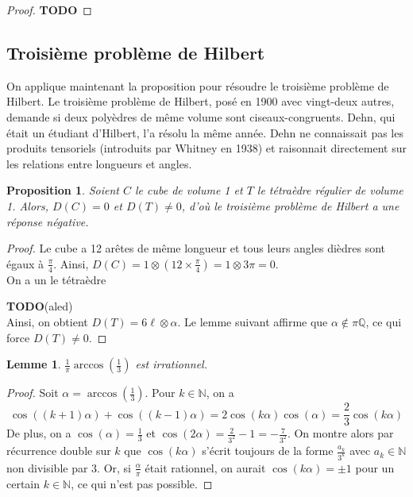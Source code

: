\documentclass{article}
\newcommand{\N}{\mathbb{N}}
\newcommand{\Q}{\mathbb{Q}}
\newcommand{\todo}{\textbf{TODO}}
\theoremstyle{plain}
\newtheorem{proposition}[theorem]{Proposition}
\newtheorem{lemma}[theorem]{Lemme}
\theoremstyle{definition}
\theoremstyle{remark}
\begin{document}
\begin{proof}
    \todo
\end{proof}

\subsection{Troisième problème de Hilbert}

On applique maintenant la proposition pour résoudre le troisième problème de Hilbert. Le troisième problème de Hilbert, posé en 1900 avec vingt-deux autres, demande si deux polyèdres de même volume sont ciseaux-congruents. Dehn, qui était un étudiant d'Hilbert, l'a résolu la même année. Dehn ne connaissait pas les produits tensoriels (introduits par Whitney en 1938) et raisonnait directement sur les relations entre longueurs et angles.

\begin{proposition} \label{propcube}
    Soient $C$ le cube de volume 1 et $T$ le tétraèdre régulier de volume 1. Alors, $D(C) = 0$ et $D(T) \ne 0$, d'où le troisième problème de Hilbert a une réponse négative.
\end{proposition}

\begin{proof}
    Le cube a 12 arêtes de même longueur et tous leurs angles dièdres sont égaux à $\frac{\pi}{4}$. Ainsi, $D(C) = 1 \otimes (12 \times \frac{\pi}{4}) = 1 \otimes 3 \pi = 0$. \\
    On a un le tétraèdre
    \todo (aled) \\
    Ainsi, on obtient $D(T) = 6 \ell \otimes \alpha$. Le lemme suivant affirme que $\alpha \notin \pi \Q$, ce qui force $D(T) \ne 0$.
\end{proof}

\begin{lemma}
    $\frac{1}{\pi}\arccos \left( \frac{1}{3} \right)$ est irrationnel.
\end{lemma}

\begin{proof}
    Soit $\alpha = \arccos \left( \frac{1}{3} \right)$. Pour $k\in \N$, on a
    \[\cos((k+1)\alpha) + \cos((k-1)\alpha) = 2 \cos(k\alpha)\cos(\alpha) = \frac{2}{3} \cos(k \alpha)\]
    De plus, on a $\cos(\alpha) = \frac{1}{3}$ et $\cos(2\alpha) = \frac{2}{3^2} - 1 = - \frac{7}{3^2}$. On montre alors par récurrence double sur $k$ que $\cos(k\alpha)$ s'écrit toujours de la forme $\frac{a_k}{3^k}$ avec $a_k \in \N$ non divisible par $3$. Or, si $\frac{\alpha}{\pi}$ était rationnel, on aurait $\cos(k\alpha) = \pm 1$ pour un certain $k \in \N$, ce qui n'est pas possible.
\end{proof}
\end{document}
